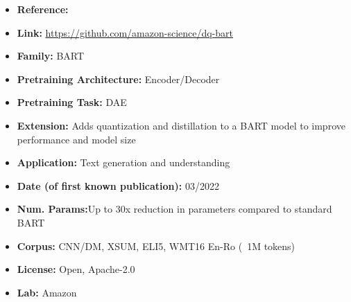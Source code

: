 \documentclass{article}
\begin{document}
            \begin{itemize}
                \item \textbf{Reference:} 
                \item \textbf{Link:} \url{https://github.com/amazon-science/dq-bart}
                \item \textbf{Family:} BART 
                \item \textbf{Pretraining Architecture:} Encoder/Decoder
                \item \textbf{Pretraining Task:} DAE
                \item \textbf{Extension:} Adds quantization and distillation to a BART model to improve performance and model size  
                \item \textbf{Application:} Text generation and understanding
                \item \textbf{Date (of first known publication):} 03/2022
                \item \textbf{Num. Params:}Up to 30x reduction in parameters compared to standard BART
                \item \textbf{Corpus:} CNN/DM, XSUM, ELI5, WMT16 En-Ro (~1M tokens)
                \item \textbf{License:} Open, Apache-2.0
                \item \textbf{Lab:} Amazon
            \end{itemize}

\end{document}
